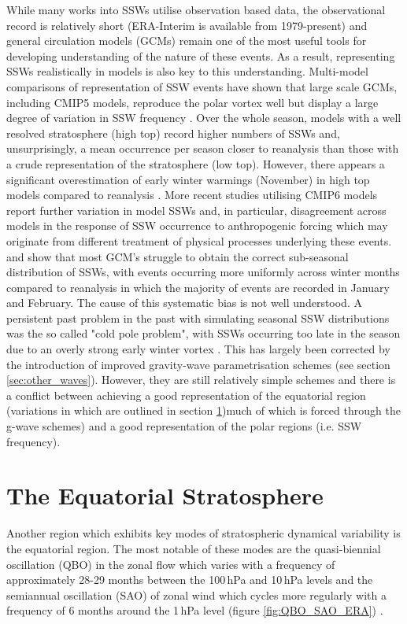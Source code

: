 While many works into SSWs utilise observation based data, the observational record is relatively short (ERA-Interim is available from 1979-present) and general circulation models (GCMs) remain one of the most useful tools for developing understanding of the nature of these events. As a result, representing SSWs realistically in models is also key to this understanding. Multi-model comparisons of representation of SSW events have shown that large scale GCMs, including CMIP5 models, reproduce the polar vortex well but display a large degree of variation in SSW frequency \citep{Butchart2011, Kim2017}. Over the whole season, models with a well resolved stratosphere (high top) record higher numbers of SSWs and, unsurprisingly, a mean occurrence per season closer to reanalysis than those with a crude representation of the stratosphere (low top). However, there appears a significant overestimation of early winter warmings (November) in high top models compared to reanalysis \citep{Kim2017}. More recent studies utilising CMIP6 models report further variation in model SSWs and, in particular, disagreement across models in the response of SSW occurrence to anthropogenic forcing \citep{ayarzaguenaUncertainty2020b} which may originate from different treatment of physical processes underlying these events. \cite{Charlton2007} and \cite{Schmidt2013} show that most GCM’s struggle to obtain the correct sub-seasonal distribution of SSWs, with events occurring more uniformly across winter months compared to reanalysis in which the majority of events are recorded in January and February. The cause of this systematic bias is not well understood. A persistent past problem in the past with simulating seasonal SSW distributions was the so called "cold pole problem", with SSWs occurring too late in the season due to an overly strong early winter vortex \citep{pawsonGCM2000, Charlton2007}. This has largely been corrected by the introduction of improved gravity-wave parametrisation schemes (see section \ref{sec:other_waves}). However, they are still relatively simple schemes and there is a conflict between achieving a good representation of the equatorial region (variations in which are outlined in section \ref{sec:equatorial_strat})much of which is forced through the g-wave schemes) and a good representation of the polar regions (i.e. SSW frequency). 

\section{The Equatorial Stratosphere}\label{sec:equatorial_strat}
Another region which exhibits key modes of stratospheric dynamical variability is the equatorial region. The most notable of these modes are the quasi-biennial oscillation (QBO) in the zonal flow which varies with a frequency of approximately 28-29 months between the 100\,hPa and 10\,hPa levels and the semiannual oscillation (SAO) of zonal wind which cycles more regularly with a frequency of 6 months around the 1\,hPa level (figure \ref{fig:QBO_SAO_ERA}) \citep{Baldwin1991}.


